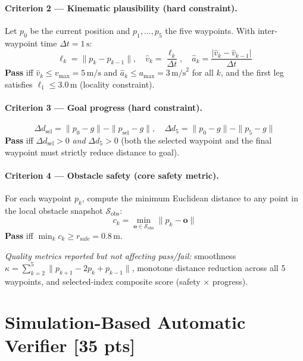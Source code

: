 \documentclass[12pt]{article}
\begin{document}
\paragraph{Criterion 2 --- Kinematic plausibility (hard constraint).}
Let $p_0$ be the current position and $p_1,\ldots,p_5$ the five waypoints. With inter-waypoint
time $\Delta t = 1\,\text{s}$:
\[
  \ell_k = \|p_k - p_{k-1}\|,\quad
  \hat{v}_k = \frac{\ell_k}{\Delta t},\quad
  \hat{a}_k = \frac{|\hat{v}_k - \hat{v}_{k-1}|}{\Delta t}
\]
\textbf{Pass} iff $\hat{v}_k \leq v_{\max} = 5\,\text{m/s}$ and
$\hat{a}_k \leq a_{\max} = 3\,\text{m/s}^2$ for all $k$, and the first leg satisfies
$\ell_1 \leq 3.0\,\text{m}$ (locality constraint).

\paragraph{Criterion 3 --- Goal progress (hard constraint).}
\[
  \Delta d_{\text{sel}} = \|p_0 - g\| - \|p_{\text{sel}} - g\|,\quad
  \Delta d_5 = \|p_0 - g\| - \|p_5 - g\|
\]
\textbf{Pass} iff $\Delta d_{\text{sel}} > 0$ \emph{and} $\Delta d_5 > 0$ (both the selected
waypoint and the final waypoint must strictly reduce distance to goal).

\paragraph{Criterion 4 --- Obstacle safety (core safety metric).}
For each waypoint $p_k$, compute the minimum Euclidean distance to any point in the local
obstacle snapshot $\mathcal{S}_{\text{obs}}$:
\[
  c_k = \min_{\mathbf{o}\in\mathcal{S}_{\text{obs}}} \|p_k - \mathbf{o}\|
\]
\textbf{Pass} iff $\min_k c_k \geq r_{\text{safe}} = 0.8\,\text{m}$.

\medskip
\noindent\textit{Quality metrics reported but not affecting pass/fail:} smoothness
$\kappa = \sum_{k=2}^{5}\|p_{k+1} - 2p_k + p_{k-1}\|$, monotone distance reduction across all
5 waypoints, and selected-index composite score (safety $\times$ progress).

\newpage
\section{Simulation-Based Automatic Verifier [35 pts]}
\end{document}

